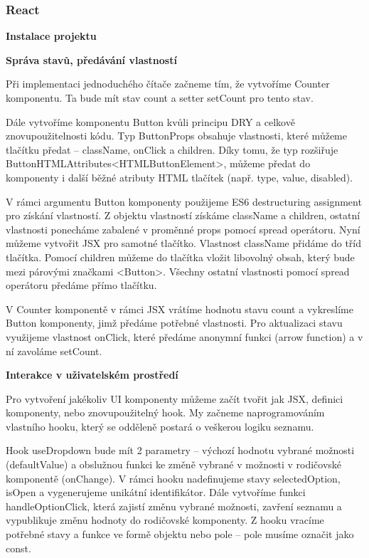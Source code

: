 \subsubsection{React}

\begin{flushleft}
  \textbf{Instalace projektu}
\end{flushleft}

\begin{flushleft}
  \textbf{Správa stavů, předávání vlastností}
\end{flushleft}

Při implementaci jednoduchého čítače začneme tím, že vytvoříme Counter komponentu. Ta bude mít stav count a setter setCount pro tento stav.

Dále vytvoříme komponentu Button kvůli principu DRY a celkově znovupoužitelnosti kódu. 
Typ ButtonProps obsahuje vlastnosti, které můžeme tlačítku předat -- className, onClick a children. 
Díky tomu, že typ rozšiřuje ButtonHTMLAttributes<HTMLButtonElement>, můžeme předat do komponenty i další běžné atributy HTML tlačítek (např. type, value, disabled).

V rámci argumentu Button komponenty použijeme ES6 destructuring assignment pro získání vlastností. 
Z objektu vlastností získáme className a children, ostatní vlastnosti ponecháme zabalené v proměnné props pomocí spread operátoru. 
Nyní můžeme vytvořit JSX pro samotné tlačítko. Vlastnost className přidáme do tříd tlačítka. 
Pomocí children můžeme do tlačítka vložit libovolný obsah, který bude mezi párovými značkami <Button>. 
Všechny ostatní vlastnosti pomocí spread operátoru předáme přímo tlačítku.

V Counter komponentě v rámci JSX vrátíme hodnotu stavu count a vykreslíme Button komponenty, jimž předáme potřebné vlastnosti. 
Pro aktualizaci stavu využijeme vlastnost onClick, které předáme anonymní funkci (arrow function) a v ní zavoláme setCount.

\begin{flushleft}
  \textbf{Interakce v uživatelském prostředí}
\end{flushleft}

Pro vytvoření jakékoliv UI komponenty můžeme začít tvořit jak JSX, definici komponenty, nebo znovupoužitelný hook. 
My začneme naprogramováním vlastního hooku, který se odděleně postará o veškerou logiku seznamu.

Hook useDropdown bude mít 2 parametry -- výchozí hodnotu vybrané možnosti (defaultValue) a obslužnou funkci ke změně vybrané v možnosti v rodičovské komponentě (onChange). 
V rámci hooku nadefinujeme stavy selectedOption, isOpen a vygenerujeme unikátní identifikátor. 
Dále vytvoříme funkci handleOptionClick, která zajistí změnu vybrané možnosti, zavření seznamu a vypublikuje změnu hodnoty do rodičovské komponenty. 
Z hooku vracíme potřebné stavy a funkce ve formě objektu nebo pole -- pole musíme označit jako const.


